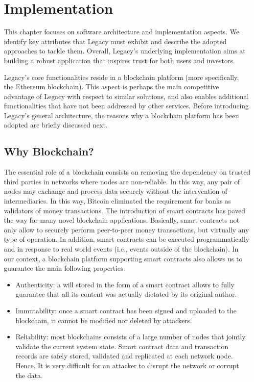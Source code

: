 \chapter{Implementation} %
\label{cha:implementation}

This chapter focuses on software architecture and implementation aspects. We identify key attributes that Legacy must exhibit and describe the adopted approaches to tackle them. Overall, Legacy’s underlying implementation aims at building a robust application that inspires trust for both users and investors.

Legacy’s core functionalities reside in a blockchain platform (more specifically, the Ethereum blockchain). This aspect is perhaps the main competitive advantage of Legacy with respect to similar solutions, and also enables additional functionalities that have not been addressed by other services. Before introducing Legacy’s general architecture, the reasons why a blockchain platform has been adopted are briefly discussed next.

\section{Why Blockchain?} %
\label{sec:why_blockchain_}

The essential role of a blockchain consists on removing the dependency on trusted third parties in networks where nodes are non-reliable. In this way, any pair of nodes may exchange and process data securely without the intervention of intermediaries. In this way, Bitcoin eliminated the requirement for banks as validators of money transactions. The introduction of smart contracts has paved the way for many novel blockchain applications. Basically, smart contracts not only allow to securely perform peer-to-peer money transactions, but virtually any type of operation. In addition, smart contracts can be executed programmatically and in response to real world events (i.e., events outside of the blockchain). In our context, a blockchain platform supporting smart contracts also allows us to guarantee the main following properties: 

\begin{itemize}
	\item Authenticity: a will stored in the form of a smart contract allows to fully guarantee that all its content was actually dictated by its original author.
	\item Immutability: once a smart contract has been signed and uploaded to the blockchain, it cannot be modified nor deleted by attackers.
	\item Reliability: most blockchains consists of a large number of nodes that jointly validate the current system state. Smart contract data and transaction records are safely stored, validated and replicated at each network node. Hence, It is very difficult for an attacker to disrupt the network or corrupt the data.
\end{itemize}

